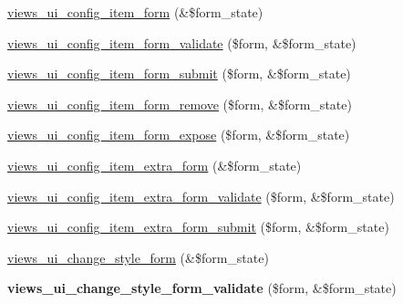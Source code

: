 \begin{CompactItemize}
\item 
\hyperlink{admin_8inc_881698f18e68deadddd14f239f351922}{views\_\-ui\_\-config\_\-item\_\-form} (\&\$form\_\-state)
\item 
\hyperlink{admin_8inc_023993084cf3409a55a8831df1d0935b}{views\_\-ui\_\-config\_\-item\_\-form\_\-validate} (\$form, \&\$form\_\-state)
\item 
\hyperlink{admin_8inc_f158b94f2b2f0886fde847d3f378c8ed}{views\_\-ui\_\-config\_\-item\_\-form\_\-submit} (\$form, \&\$form\_\-state)
\item 
\hyperlink{admin_8inc_7f602db6d4cc41b412a8ace2d6320ea8}{views\_\-ui\_\-config\_\-item\_\-form\_\-remove} (\$form, \&\$form\_\-state)
\item 
\hyperlink{admin_8inc_3a3a7734f5b034e63b7866c326c70229}{views\_\-ui\_\-config\_\-item\_\-form\_\-expose} (\$form, \&\$form\_\-state)
\item 
\hyperlink{admin_8inc_3394e32b3f8096b6edf8c2fec4906751}{views\_\-ui\_\-config\_\-item\_\-extra\_\-form} (\&\$form\_\-state)
\item 
\hyperlink{admin_8inc_70cfe0eb4a09c66d85dc24fd55a57b30}{views\_\-ui\_\-config\_\-item\_\-extra\_\-form\_\-validate} (\$form, \&\$form\_\-state)
\item 
\hyperlink{admin_8inc_d5e1d436875b612146deb11b52a3b98e}{views\_\-ui\_\-config\_\-item\_\-extra\_\-form\_\-submit} (\$form, \&\$form\_\-state)
\item 
\hyperlink{admin_8inc_a94927cb8215f90a8b01211dae1e426f}{views\_\-ui\_\-change\_\-style\_\-form} (\&\$form\_\-state)
\item 
\hypertarget{admin_8inc_80324ec034d50a20b245c05b43e23578}{
\textbf{views\_\-ui\_\-change\_\-style\_\-form\_\-validate} (\$form, \&\$form\_\-state)}
\label{admin_8inc_80324ec034d50a20b245c05b43e23578}


\end{CompactItemize}
